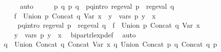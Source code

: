 \begin{isabellebody}
\ \ \ \ \isamarkupfalse%
\ auto\isanewline
\ \ \isamarkupfalse%
\ \isamarkupfalse%
\ p{}\ q{}\ p{}\ q{}\ \ p{}{\isacharunderscore}{\kern0pt}q{}{\isacharunderscore}{\kern0pt}intro{\isacharcolon}{\kern0pt}\ {\isachardoublequoteopen}reg{\isacharunderscore}{\kern0pt}eval\ p{}\ {\isasymand}\ reg{\isacharunderscore}{\kern0pt}eval\ q{}\ {\isasymand}\isanewline
\ \ \ \ f{}{\isacharprime}{\kern0pt}\ {\isacharequal}{\kern0pt}\ Union\ p{}\ {\isacharparenleft}{\kern0pt}Concat\ q{}\ {\isacharparenleft}{\kern0pt}Var\ x{\isacharparenright}{\kern0pt}{\isacharparenright}{\kern0pt}\ {\isasymand}\ {\isacharparenleft}{\kern0pt}{\isasymforall}y\ {\isasymin}\ vars\ p{}{\isachardot}{\kern0pt}\ y\ {\isasymnoteq}\ x{\isacharparenright}{\kern0pt}{\isachardoublequoteclose}\isanewline
\ \ \ \ \ p{}{\isacharunderscore}{\kern0pt}q{}{\isacharunderscore}{\kern0pt}intro{\isacharcolon}{\kern0pt}\ {\isachardoublequoteopen}reg{\isacharunderscore}{\kern0pt}eval\ p{}\ {\isasymand}\ reg{\isacharunderscore}{\kern0pt}eval\ q{}\ {\isasymand}\ f{}{\isacharprime}{\kern0pt}\ {\isacharequal}{\kern0pt}\ Union\ p{}\ {\isacharparenleft}{\kern0pt}Concat\ q{}\ {\isacharparenleft}{\kern0pt}Var\ x{\isacharparenright}{\kern0pt}{\isacharparenright}{\kern0pt}\ {\isasymand}\isanewline
\ \ \ \ {\isacharparenleft}{\kern0pt}{\isasymforall}y\ {\isasymin}\ vars\ p{}{\isachardot}{\kern0pt}\ y\ {\isasymnoteq}\ x{\isacharparenright}{\kern0pt}{\isachardoublequoteclose}\ \isamarkupfalse%
\ bipart{\isacharunderscore}{\kern0pt}rlexp{\isacharunderscore}{\kern0pt}def\ \isamarkupfalse%
\ auto\isanewline
\isanewline
\ \ \isamarkupfalse%
\ {\isacharquery}{\kern0pt}q{\isacharprime}{\kern0pt}\ {\isacharequal}{\kern0pt}\ {\isachardoublequoteopen}Union\ {\isacharparenleft}{\kern0pt}Concat\ q{}\ {\isacharparenleft}{\kern0pt}Concat\ {\isacharparenleft}{\kern0pt}Var\ x{\isacharparenright}{\kern0pt}\ q{}{\isacharparenright}{\kern0pt}{\isacharparenright}{\kern0pt}\ {\isacharparenleft}{\kern0pt}Union\ {\isacharparenleft}{\kern0pt}Concat\ p{}\ q{}{\isacharparenright}{\kern0pt}\ {\isacharparenleft}{\kern0pt}Concat\ q{}\ p{}{\isacharparenright}{\kern0pt}{\isacharparenright}{\kern0pt}{\isachardoublequoteclose}\isanewline

\end{isabellebody}
